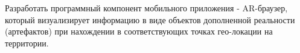 
Разработать программный компонент мобильного приложения - AR-браузер, который визуализирует информацию в виде объектов дополненной реальности (артефактов) при нахождении в соответствующих точках гео-локации на территории.

